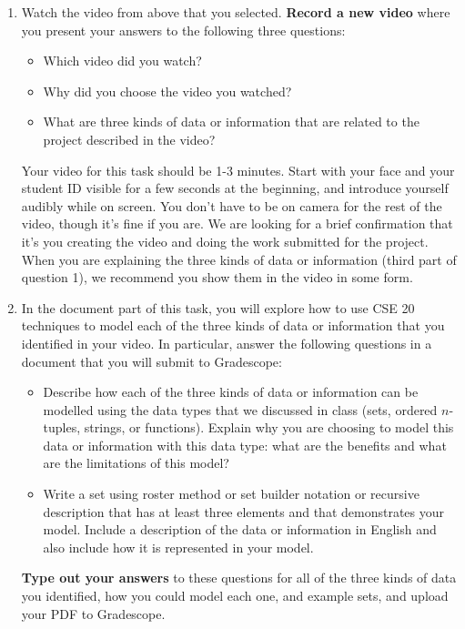 \begin{enumerate}
\item Watch the video from above that you selected. {\bf Record a new video} where you present 
your answers to the following three questions:
\begin{itemize}
    \item Which video did you watch?
    \item Why did you choose the video you watched?
    \item What are three kinds of data or information that are related to the project described in the video?
\end{itemize}
Your video for this task should be 1-3 minutes. Start with 
your face and your student ID visible for a few seconds at the beginning, and introduce yourself audibly while on screen. 
You don't have to be on camera for the rest of the video, though it's fine if you are. 
We are looking for a brief confirmation that it's you creating the video and doing the work 
submitted for the project. When you are explaining the three kinds of data or information (third part of question 1), 
we recommend you show them in the video in some form.

\item In the document part of this task, you will explore how to use CSE 20 techniques to 
model each of the three kinds of data or 
information that you identified in 
your video. In particular, answer the following questions in a document 
that you will submit to Gradescope:
\begin{itemize}
    \item Describe how each of the three kinds of data or information 
    can be modelled using the data types that we discussed in class (sets, ordered $n$-tuples, 
    strings, or functions). Explain why you are choosing to model this data or information with this data type: what are the benefits 
    and what are the limitations of this model?
    \item Write a set using roster method or set builder notation or recursive description that has at least three elements
    and that demonstrates
    your model. Include a description of the data or information in English and also include how it is represented 
    in your model.
\end{itemize}
{\bf Type out your answers} to these questions for all of the three kinds of data you identified, 
how you could model each one, and example sets, and upload your PDF 
to Gradescope.
\end{enumerate}


